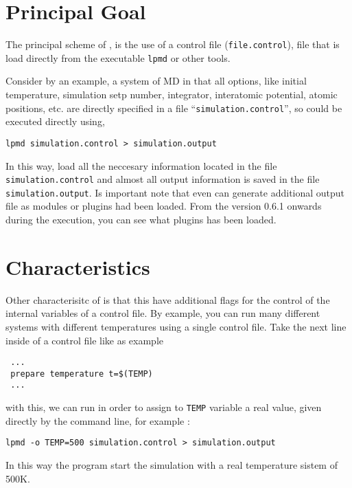 \section{Principal Goal}

The principal scheme of {\lpmd}, is the use of a control file
(\verb|file.control|), file that is load directly from the executable
\verb|lpmd| or other tools.

Consider by an example, a system of MD in that all options, like initial
temperature, simulation setp number, integrator, interatomic potential, atomic
positions, etc. are directly specified in a file ``\verb|simulation.control|'',
so {\lpmd} could be executed directly using, 

\begin{center}
 \texttt{lpmd simulation.control > simulation.output}
\end{center}
\noindent

In this way, {\lpmd} load all the neccesary information located in the file
\verb|simulation.control| and almost all output information is saved in the file
\verb|simulation.output|. Is important note that {\lpmd} even can generate
additional output file as modules or plugins had been loaded. From the version
0.6.1 onwards during the {\lpmd} execution, you can see what plugins has been
loaded.

\section{Characteristics}

Other characterisitc of {\lpmd} is that this have additional flags for the
control of the internal variables of a control file. By example, you can run
many different systems with different temperatures using a single control file.
Take the next line inside of a control file like as example

\begin{verbatim}
 ...
 prepare temperature t=$(TEMP)
 ...
\end{verbatim}
\noindent
with this, we can run {\lpmd} in order to assign to \verb|TEMP| variable a real
value, given directly by the command line, for example :

\begin{center}
 \texttt{lpmd -o TEMP=500 simulation.control > simulation.output}
\end{center}
\noindent
In this way the program start the simulation with a real temperature sistem of
500K.

